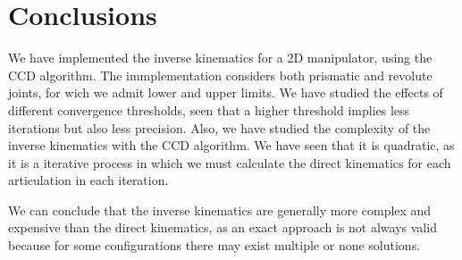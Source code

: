 
\section{Conclusions}
We have implemented the inverse kinematics for a 2D manipulator, using the CCD algorithm. The immplementation considers both prismatic and revolute joints, for wich we admit lower and upper limits.
We have studied the effects of different convergence thresholds, seen that a higher threshold implies less iterations but also less precision.
Also, we have studied the complexity of the inverse kinematics with the CCD algorithm. We have seen that it is quadratic, as it is a iterative process in which we must calculate the direct kinematics for each articulation in each iteration.

\bigskip We can conclude that the inverse kinematics are generally more complex and expensive than the direct kinematics, as an exact approach is not always valid because for some configurations there may exist multiple or none solutions. 

